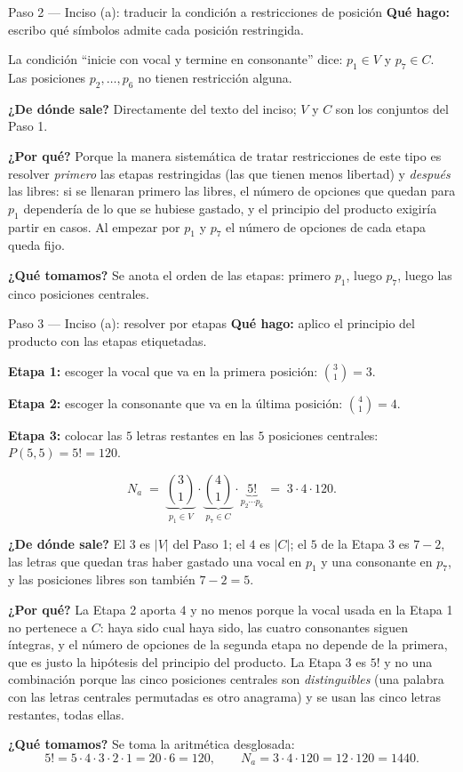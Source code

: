 \documentclass[11pt]{article}
\begin{document}
\begin{paso}{Paso 2 --- Inciso (a): traducir la condición a restricciones de posición}
\textbf{Qué hago:} escribo qué símbolos admite cada posición restringida.

La condición ``inicie con vocal y termine en consonante'' dice: $p_1\in V$ y $p_7\in C$. Las posiciones $p_2,\dots,p_6$ no tienen restricción alguna.

\textbf{¿De dónde sale?} Directamente del texto del inciso; $V$ y $C$ son los conjuntos del Paso 1.

\textbf{¿Por qué?} Porque la manera sistemática de tratar restricciones de este tipo es resolver \emph{primero} las etapas restringidas (las que tienen menos libertad) y \emph{después} las libres: si se llenaran primero las libres, el número de opciones que quedan para $p_1$ dependería de lo que se hubiese gastado, y el principio del producto exigiría partir en casos. Al empezar por $p_1$ y $p_7$ el número de opciones de cada etapa queda fijo.

\textbf{¿Qué tomamos?} Se anota el orden de las etapas: primero $p_1$, luego $p_7$, luego las cinco posiciones centrales.
\end{paso}

\begin{paso}{Paso 3 --- Inciso (a): resolver por etapas}
\textbf{Qué hago:} aplico el principio del producto con las etapas etiquetadas.

\medskip
\textbf{Etapa 1:} escoger la vocal que va en la primera posición: $\displaystyle\binom{3}{1}=3$.

\textbf{Etapa 2:} escoger la consonante que va en la última posición: $\displaystyle\binom{4}{1}=4$.

\textbf{Etapa 3:} colocar las $5$ letras restantes en las $5$ posiciones centrales: $\displaystyle P(5,5)=5!=120$.

\medskip
\[
  N_a \;=\; \underbrace{\binom{3}{1}}_{p_1\in V} \cdot \underbrace{\binom{4}{1}}_{p_7\in C} \cdot \underbrace{5!}_{p_2\cdots p_6} \;=\; 3\cdot 4\cdot 120 .
\]

\textbf{¿De dónde sale?} El $3$ es $|V|$ del Paso 1; el $4$ es $|C|$; el $5$ de la Etapa 3 es $7-2$, las letras que quedan tras haber gastado una vocal en $p_1$ y una consonante en $p_7$, y las posiciones libres son también $7-2=5$.

\textbf{¿Por qué?} La Etapa 2 aporta $4$ y no menos porque la vocal usada en la Etapa 1 no pertenece a $C$: haya sido cual haya sido, las cuatro consonantes siguen íntegras, y el número de opciones de la segunda etapa no depende de la primera, que es justo la hipótesis del principio del producto. La Etapa 3 es $5!$ y no una combinación porque las cinco posiciones centrales son \emph{distinguibles} (una palabra con las letras centrales permutadas es otro anagrama) y se usan las cinco letras restantes, todas ellas.

\textbf{¿Qué tomamos?} Se toma la aritmética desglosada:
\[
  5!=5\cdot 4\cdot 3\cdot 2\cdot 1 = 20\cdot 6 = 120 ,\qquad N_a = 3\cdot 4\cdot 120 = 12\cdot 120 = 1440 .
\]
\end{paso}
\end{document}
